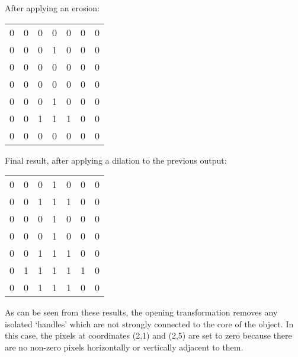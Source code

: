 \documentclass[11pt]{article}
\begin{document}
After applying an erosion:

\begin{tabular}{c c c c c c c}
0 & 0 & 0 & 0 & 0 & 0 & 0 \\
0 & 0 & 0 & 1 & 0 & 0 & 0 \\
0 & 0 & 0 & 0 & 0 & 0 & 0 \\
0 & 0 & 0 & 0 & 0 & 0 & 0 \\
0 & 0 & 0 & 1 & 0 & 0 & 0 \\
0 & 0 & 1 & 1 & 1 & 0 & 0 \\
0 & 0 & 0 & 0 & 0 & 0 & 0 \\
\end{tabular}

Final result, after applying a dilation to the previous output:

\begin{tabular}{c c c c c c c}
0 & 0 & 0 & 1 & 0 & 0 & 0 \\
0 & 0 & 1 & 1 & 1 & 0 & 0 \\
0 & 0 & 0 & 1 & 0 & 0 & 0 \\
0 & 0 & 0 & 1 & 0 & 0 & 0 \\
0 & 0 & 1 & 1 & 1 & 0 & 0 \\
0 & 1 & 1 & 1 & 1 & 1 & 0 \\
0 & 0 & 1 & 1 & 1 & 0 & 0 \\
\end{tabular}

As can be seen from these results, the opening transformation removes any
isolated `handles' which are not strongly connected to the core of the object.
In this case, the pixels at coordinates (2,1) and (2,5) are set to zero because
there are no non-zero pixels horizontally or vertically adjacent to them.
\end{document}
